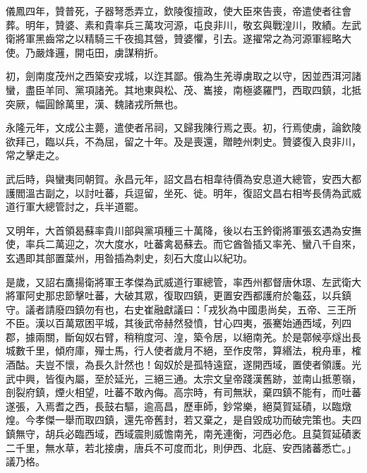 \begin{pinyinscope}
 儀鳳四年，贊普死，子器弩悉弄立，欽陵復擅政，使大臣來告喪，帝遣使者往會葬。明年，贊婆、素和貴率兵三萬攻河源，屯良非川，敬玄與戰湟川，敗績。左武衛將軍黑齒常之以精騎三千夜搗其營，贊婆懼，引去。遂擢常之為河源軍經略大使。乃嚴烽邏，開屯田，虜謀稍折。



 初，劍南度茂州之西築安戎城，以迮其鄙。俄為生羌導虜取之以守，因並西洱河諸蠻，盡臣羊同、黨項諸羌。其地東與松、茂、巂接，南極婆羅門，西取四鎮，北抵突厥，幅圓餘萬里，漢、魏諸戎所無也。



 永隆元年，文成公主薨，遣使者吊祠，又歸我陳行焉之喪。初，行焉使虜，論欽陵欲拜己，臨以兵，不為屈，留之十年。及是喪還，贈睦州刺史。贊婆復入良非川，常之擊走之。



 武后時，與蠻夷同朝賀。永昌元年，詔文昌右相韋待價為安息道大總管，安西大都護閻溫古副之，以討吐蕃，兵逗留，坐死、徙。明年，復詔文昌右相岑長倩為武威道行軍大總管討之，兵半道罷。



 又明年，大首領曷蘇率貴川部與黨項種三十萬降，後以右玉鈐衛將軍張玄遇為安撫使，率兵二萬迎之，次大度水，吐蕃禽曷蘇去。而它酋昝插又率羌、蠻八千自來，玄遇即其部置葉州，用昝插為刺史，刻石大度山以紀功。



 是歲，又詔右鷹揚衛將軍王孝傑為武威道行軍總管，率西州都督唐休璟、左武衛大將軍阿史那忠節擊吐蕃，大破其眾，復取四鎮，更置安西都護府於龜茲，以兵鎮守。議者請廢四鎮勿有也，右史崔融獻議曰：「戎狄為中國患尚矣，五帝、三王所不臣。漢以百萬眾困平城，其後武帝赫然發憤，甘心四夷，張騫始通西域，列四郡，據兩關，斷匈奴右臂，稍稍度河、湟，築令居，以絕南羌。於是鄣候亭燧出長城數千里，傾府庫，殫士馬，行人使者歲月不絕，至作皮幣，算緡法，稅舟車，榷酒酤。夫豈不懷，為長久計然也！匈奴於是孤特遠竄，遂開西域，置使者領護。光武中興，皆復內屬，至於延光，三絕三通。太宗文皇帝踐漢舊跡，並南山抵蔥嶺，剖裂府鎮，煙火相望，吐蕃不敢內侮。高宗時，有司無狀，棄四鎮不能有，而吐蕃遂張，入焉耆之西，長鼓右驅，逾高昌，歷車師，鈔常樂，絕莫賀延磧，以臨燉煌。今孝傑一舉而取四鎮，還先帝舊封，若又棄之，是自毀成功而破完策也。夫四鎮無守，胡兵必臨西域，西域震則威憺南羌，南羌連衡，河西必危。且莫賀延磧袤二千里，無水草，若北接虜，唐兵不可度而北，則伊西、北庭、安西諸蕃悉亡。」議乃格。




\end{pinyinscope}
